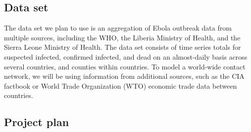 \documentclass[10pt, journal,onecolumn]{IEEEtran}
\begin{document}
\subsection{Data set}

The data set we plan to use \citep{cmriversdata} is an aggregation of Ebola outbreak data
from multiple sources, including the WHO, the Liberia Ministry of Health, and the Sierra Leone
Ministry of Health. The data set consists of time series totals for suspected infected, confirmed
infected, and dead on an almost-daily basis across several countries, and counties within countries.
To model a world-wide contact network, we will be using information from additional sources, such
as the CIA factbook or World Trade Organization (WTO) economic trade data between countries.



\subsection{Project plan}
\end{document}
